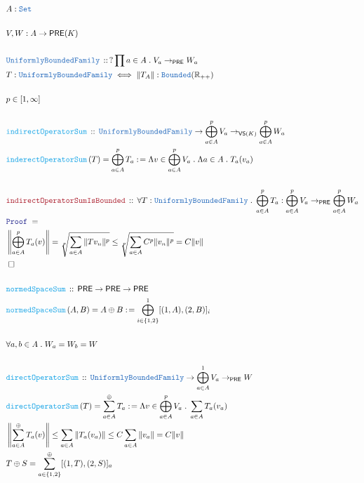 \documentclass[12pt]{scrartcl}
\newcommand{\TYPE}[1]{\textcolor{NavyBlue}{\mathtt{#1}}}
\newcommand{\FUNC}[1]{\textcolor{Cerulean}{\mathtt{#1}}}
\newcommand{\LOGIC}[1]{\textcolor{Blue}{\mathtt{#1}}}
\newcommand{\THM}[1]{\textcolor{Maroon}{\mathtt{#1}}}
\renewcommand{\.}{\; . \;}
\newcommand{\de}{: \kern 0.1pc =}
\newcommand{\Act}[1]{\left( #1 \right)}
\newcommand{\Theorem}[2]{& \THM{#1} \, :: \, #2 \\ & \Proof = \\ }
\newcommand{\DeclareType}[2]{& \TYPE{#1} \, :: \, #2 \\}
\newcommand{\DefineType}[3]{& #1 : \TYPE{#2} \iff #3 \\}
\newcommand{\DeclareFunc}[2]{& \FUNC{#1} \, :: \, #2 \\}
\newcommand{\DefineNamedFunc}[4]{&  \FUNC{#1}\Act{#2} = #3 \de #4 \\}
\newcommand{\Page}[1]{\begin{align*} #1 \end{align*} \newpage   }
\newcommand{\Reals}{\mathbb{R} }
\newcommand{\Set}{\TYPE{Set}}
\newcommand{\QED}{\; \square}
\newcommand{\EndProof}{& \QED \\}
\newcommand{\Proof}{\LOGIC{Proof} \; }
\newcommand{\PRE}{\mathsf{PRE}} %
\begin{document}
     \Page{    
     & A : \Set \\
     \\
     & V,W : A \to \PRE(K) \\
     \\
     \DeclareType{UniformlyBoundedFamily}{ ? \prod a \in A \. V_a \to_\PRE W_a }
     \DefineType{T}{UniformlyBoundedFamily}{\| T_A \| : \TYPE{Bounded}(\Reals_{++})}
     \\
     & p \in [1,\infty] \\
     \\
     \DeclareFunc{indirectOperatorSum}{ \TYPE{UniformlyBoundedFamily} \to \bigoplus^p_{a \in A} V_a 
     \to_{\mathsf{VS}(K)} \bigoplus^p_{a \in A} W_a }
     \DefineNamedFunc{inderectOperatorSum}{T}{ \bigoplus^p_{a \in A} T_a}{ 
      \Lambda v \in \bigoplus^p_{a \in A} V_a \. \Lambda a \in A \. T_a(v_a)}
      \\
      \Theorem{indirectOperatorSumIsBounded}{ \forall T : \TYPE{UniformlyBoundedFamily} 
          \.     \bigoplus^p_{a \in A} T_a  :  \bigoplus^p_{a \in A} V_a 
     \to_{\PRE} \bigoplus^p_{a \in A} W_a}
       & \left \| \bigoplus^p_{a \in A} T_a (v)  \right \|  = \sqrt[p]{\sum_{a \in A} \| T v_n \|^p } \le 
        \sqrt[p]{\sum_{a \in A} C^p \|  v_n \|^p}  = C \| v \|   \\      
         \EndProof
         \\
         \DeclareFunc{normedSpaceSum}{ \PRE \to \PRE \to \PRE}
         \DefineNamedFunc{normedSpaceSum}{ A,B }{ A \oplus B}{ \bigoplus^1_{i \in \{ 1,2 \}}
              [(1,A),(2,B)]_i         
          }
         \\
         & \forall a, b \in A \. W_a = W_b = W \\
         \\
       \DeclareFunc{directOperatorSum}{ \TYPE{UniformlyBoundedFamily} \to
        \bigoplus^1_{a \in A} V_a  \to_\PRE W 
           }
        \DefineNamedFunc{directOperatorSum}{ T }{ \sum^{\oplus}_{a \in A} T_a}{ 
          \Lambda v \in \bigoplus^p_{a \in A} V_a \. \sum_{a \in A} T_a(v_a)        
        }       
     &  \left \| \sum^{\oplus}_{a \in A} T_a (v)  \right\| \le \sum_{a \in A} \| T_a(v_a) \|
        \le    C\sum_{a \in A} \| v_a \| = C\| v \| \\         
    &  T \oplus S = \sum^\oplus_{a \in \{1,2 \} } [(1,T),(2,S)]_a             
      }
\end{document}
